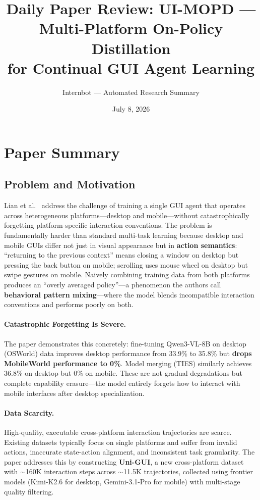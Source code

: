 \documentclass[11pt,a4paper]{article}
\title{Daily Paper Review: UI-MOPD --- Multi-Platform On-Policy Distillation\\for Continual GUI Agent Learning}
\author{Internbot --- Automated Research Summary}
\date{July 8, 2026}
\begin{document}
\maketitle

\section{Paper Summary}

\subsection{Problem and Motivation}

Lian et al.~\cite{lian2026uimopd} address the challenge of training a single GUI agent that operates across heterogeneous platforms---desktop and mobile---without catastrophically forgetting platform-specific interaction conventions. The problem is fundamentally harder than standard multi-task learning because desktop and mobile GUIs differ not just in visual appearance but in \textbf{action semantics}: ``returning to the previous context'' means closing a window on desktop but pressing the back button on mobile; scrolling uses mouse wheel on desktop but swipe gestures on mobile. Naively combining training data from both platforms produces an ``overly averaged policy''---a phenomenon the authors call \textbf{behavioral pattern mixing}---where the model blends incompatible interaction conventions and performs poorly on both.

\paragraph{Catastrophic Forgetting Is Severe.} The paper demonstrates this concretely: fine-tuning Qwen3-VL-8B on desktop (OSWorld) data improves desktop performance from 33.9\% to 35.8\% but \textbf{drops MobileWorld performance to 0\%}. Model merging (TIES) similarly achieves 36.8\% on desktop but 0\% on mobile. These are not gradual degradations but complete capability erasure---the model entirely forgets how to interact with mobile interfaces after desktop specialization.

\paragraph{Data Scarcity.} High-quality, executable cross-platform interaction trajectories are scarce. Existing datasets typically focus on single platforms and suffer from invalid actions, inaccurate state-action alignment, and inconsistent task granularity. The paper addresses this by constructing \textbf{Uni-GUI}, a new cross-platform dataset with $\sim$160K interaction steps across $\sim$11.5K trajectories, collected using frontier models (Kimi-K2.6 for desktop, Gemini-3.1-Pro for mobile) with multi-stage quality filtering.
\end{document}

